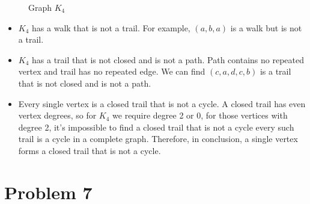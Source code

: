 \documentclass{article}
\begin{document}
\begin{figure}[H]
\centering
{}
\caption{Graph $K_4$}
\end{figure}
\begin{itemize}
\item \(K_4\) has a walk that is not a trail. For example, \((a,b,a)\) is a walk but is not a trail. 
\item \(K_4\) has a trail that is not closed and is not a path. Path contains no repeated vertex and trail has no repeated edge. We can find \((c,a,d,c,b)\) is a trail that is not closed and is not a path.
\item Every single vertex is a closed trail that is not a cycle. A closed trail has even vertex degrees, so for \(K_4\) we require degree 2 or 0, for those vertices with degree 2, it's impossible to find a closed trail that is not a cycle every such trail is a cycle in a complete graph. Therefore, in conclusion, a single vertex forms a closed trail that is not a cycle. 


\end{itemize}


\section*{Problem 7}
\end{document}
